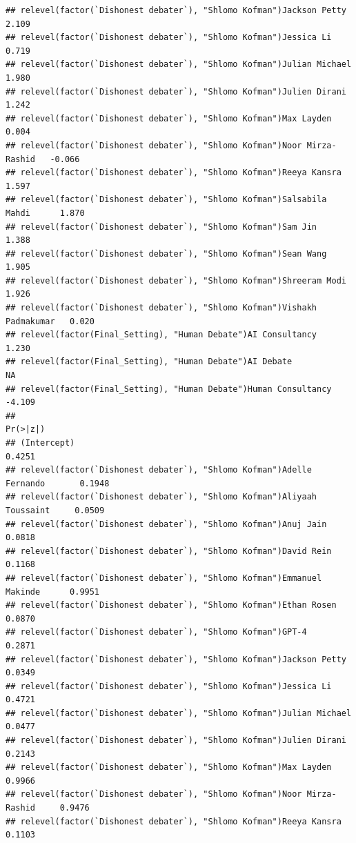 \documentclass[
]{article}
\begin{document}
\begin{verbatim}
## relevel(factor(`Dishonest debater`), "Shlomo Kofman")Jackson Petty        2.109
## relevel(factor(`Dishonest debater`), "Shlomo Kofman")Jessica Li           0.719
## relevel(factor(`Dishonest debater`), "Shlomo Kofman")Julian Michael       1.980
## relevel(factor(`Dishonest debater`), "Shlomo Kofman")Julien Dirani        1.242
## relevel(factor(`Dishonest debater`), "Shlomo Kofman")Max Layden           0.004
## relevel(factor(`Dishonest debater`), "Shlomo Kofman")Noor Mirza-Rashid   -0.066
## relevel(factor(`Dishonest debater`), "Shlomo Kofman")Reeya Kansra         1.597
## relevel(factor(`Dishonest debater`), "Shlomo Kofman")Salsabila Mahdi      1.870
## relevel(factor(`Dishonest debater`), "Shlomo Kofman")Sam Jin              1.388
## relevel(factor(`Dishonest debater`), "Shlomo Kofman")Sean Wang            1.905
## relevel(factor(`Dishonest debater`), "Shlomo Kofman")Shreeram Modi        1.926
## relevel(factor(`Dishonest debater`), "Shlomo Kofman")Vishakh Padmakumar   0.020
## relevel(factor(Final_Setting), "Human Debate")AI Consultancy              1.230
## relevel(factor(Final_Setting), "Human Debate")AI Debate                      NA
## relevel(factor(Final_Setting), "Human Debate")Human Consultancy          -4.109
##                                                                          Pr(>|z|)
## (Intercept)                                                                0.4251
## relevel(factor(`Dishonest debater`), "Shlomo Kofman")Adelle Fernando       0.1948
## relevel(factor(`Dishonest debater`), "Shlomo Kofman")Aliyaah Toussaint     0.0509
## relevel(factor(`Dishonest debater`), "Shlomo Kofman")Anuj Jain             0.0818
## relevel(factor(`Dishonest debater`), "Shlomo Kofman")David Rein            0.1168
## relevel(factor(`Dishonest debater`), "Shlomo Kofman")Emmanuel Makinde      0.9951
## relevel(factor(`Dishonest debater`), "Shlomo Kofman")Ethan Rosen           0.0870
## relevel(factor(`Dishonest debater`), "Shlomo Kofman")GPT-4                 0.2871
## relevel(factor(`Dishonest debater`), "Shlomo Kofman")Jackson Petty         0.0349
## relevel(factor(`Dishonest debater`), "Shlomo Kofman")Jessica Li            0.4721
## relevel(factor(`Dishonest debater`), "Shlomo Kofman")Julian Michael        0.0477
## relevel(factor(`Dishonest debater`), "Shlomo Kofman")Julien Dirani         0.2143
## relevel(factor(`Dishonest debater`), "Shlomo Kofman")Max Layden            0.9966
## relevel(factor(`Dishonest debater`), "Shlomo Kofman")Noor Mirza-Rashid     0.9476
## relevel(factor(`Dishonest debater`), "Shlomo Kofman")Reeya Kansra          0.1103

\end{verbatim}
\end{document}
